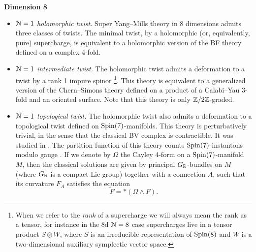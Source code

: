 \documentclass[10pt, oneside]{article}
\begin{document}
\textbf{Dimension 8}
\begin{itemize}
 \item \emph{$\mathcal{N}=1$ holomorphic twist.} Super Yang--Mills theory in 8 dimensions admits three classes of twists.  The minimal twist, by a holomorphic (or, equivalently, pure) supercharge, is equivalent to a holomorphic version of the BF theory defined on a complex 4-fold.
 \item \emph{$\mathcal{N}=1$ intermediate twist.} The holomorphic twist admits a deformation to a twist by a rank 1 impure spinor \footnote{When we refer to the \emph{rank} of a supercharge we will always mean the rank as a tensor, for instance in the 8d $\mathcal{N}=8$ case supercharges live in a tensor product $S \otimes W$, where $S$ is an irreducible representation of $\mathrm{Spin}(8)$ and $W$ is a two-dimensional auxiliary symplectic vector space.}. This theory is equivalent to a generalized version of the Chern--Simons theory defined on a product of a Calabi--Yau 3-fold and an oriented surface. Note that this theory is only $\mathbb Z/2\mathbb Z$-graded.
 \item \emph{$\mathcal{N}=1$ topological twist.} The holomorphic twist also admits a deformation to a topological twist defined on $\mathrm{Spin}(7)$-manifolds. This theory is perturbatively trivial, in the sense that the classical BV complex is contractible. It was studied in \cite{AcharyaOLoughlinSpence,BaulieuKannoSinger}. The partition function of this theory counts $\mathrm{Spin}(7)$-instantons modulo gauge \cite{Lewis,DonaldsonThomas,ReyesCarrion}. If we denote by $\Omega$ the Cayley 4-form on a $\mathrm{Spin}(7)$-manifold $M$, then the classical solutions are given by principal $G_\mathbb R$-bundles on $M$ (where $G_\mathbb R$ is a compact Lie group) together with a connection $A$, such that its curvature $F_A$ satisfies the equation
\begin{equation} 
 F = \ast (\Omega\wedge F).
 \end{equation}
\end{itemize}
\end{document}
